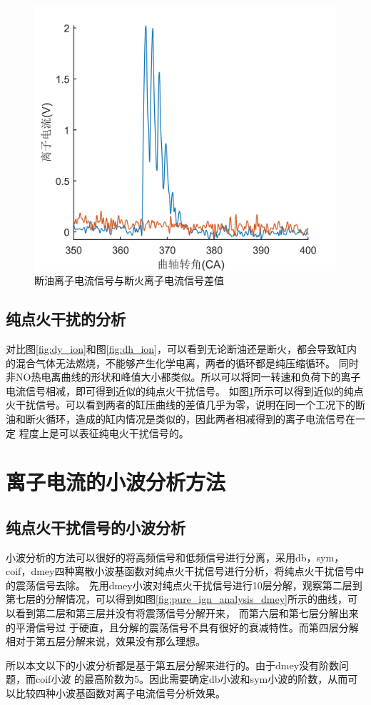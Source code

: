 \begin{figure}[htb]
\begin{minipage}[t]{0.5\linewidth}
	\includegraphics[width=\textwidth]{thesis_figure/ion_chapter/diff_dy_dh_detail}
\end{minipage}
	\caption{断油离子电流信号与断火离子电流信号差值}
	\label{fig:diff_dy_dh}
\end{figure}
\subsection{纯点火干扰的分析}
对比图\ref{fig:dy_ion}和图\ref{fig:dh_ion}，可以看到无论断油还是断火，都会导致缸内的混合气体无法燃烧，不能够产生化学电离，两者的循环都是纯压缩循环。
同时非NO热电离曲线的形状和峰值大小都类似。所以可以将同一转速和负荷下的离子电流信号相减，即可得到近似的纯点火干扰信号。
如图\ref{fig:diff_dy_dh}所示可以得到近似的纯点火干扰信号。可以看到两者的缸压曲线的差值几乎为零，说明在同一个工况下的断油和断火循环，造成的缸内情况是类似的，因此两者相减得到的离子电流信号在一定
程度上是可以表征纯电火干扰信号的。
\section{离子电流的小波分析方法}
\subsection{纯点火干扰信号的小波分析} 
小波分析的方法可以很好的将高频信号和低频信号进行分离，采用db，sym，coif，dmey四种离散小波基函数对纯点火干扰信号进行分析，将纯点火干扰信号中的震荡信号去除。
先用dmey小波对纯点火干扰信号进行10层分解，观察第二层到第七层的分解情况，可以得到如图\ref{fig:pure_ign_analysis_dmey}所示的曲线，可以看到第二层和第三层并没有将震荡信号分解开来，
而第六层和第七层分解出来的平滑信号过
于硬直，且分解的震荡信号不具有很好的衰减特性。而第四层分解相对于第五层分解来说，效果没有那么理想。\par
所以本文以下的小波分析都是基于第五层分解来进行的。由于dmey没有阶数问题，而coif小波
的最高阶数为5。因此需要确定db小波和sym小波的阶数，从而可以比较四种小波基函数对离子电流信号分析效果。
